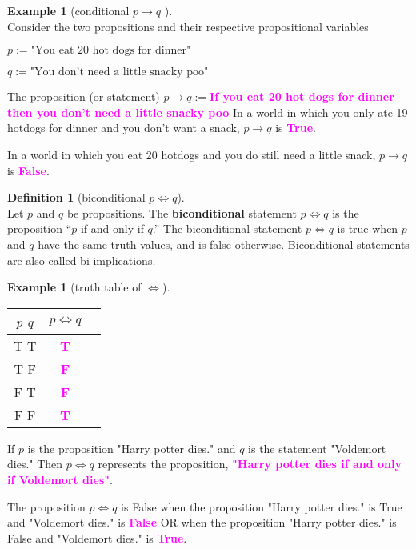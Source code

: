 \documentclass[letterpaper,10pt]{article}
\theoremstyle{plain}
\theoremstyle{definition}
\newtheorem{defn}[thm]{Definition}
\newtheorem{exmp}[thm]{Example}
\theoremstyle{remark}
\providecommand{\todo}[1]{\textcolor{magenta}{\textbf{#1}}}
\begin{document}
\newpage

\begin{exmp}[conditional $p\to q$ ] \ \\

Consider the two propositions and their respective propositional variables

$ p:=\text{"You eat 20 hot dogs for dinner"} $

$ q:=\text{"You don't need a little snacky poo"} $

The proposition (or statement)
\newline
$p\to q:= $\todo{If you eat 20 hot dogs for dinner then you don't need a little snacky poo }
\newline
In a world in which you only ate 19 hotdogs for dinner and you don't want a snack, $p\to q$ is \todo{True}.

In a world in which you eat 20 hotdogs and you do still need a little snack, $p \to q$ is \todo{False}.

\end{exmp}

\begin{defn}[biconditional $p\iff q$]\ \\
Let $p$ and $q$ be propositions. The \textbf{biconditional} statement $p \iff q$ is the proposition “$p$ if
and only if $q$.” The biconditional statement $p \iff q$ is true when $p$ and $q$ have the same truth
values, and is false otherwise. Biconditional statements are also called bi-implications.
\end{defn}

\begin{exmp}[truth table of $\iff$]
\begin{center}
\begin{tabular}{ | c | c | c |} 
  \hline
 $p$ $q$ & $ p \iff q$ \\
 \hline
  T T & \todo{T} \\ 
  T F & \todo{F} \\ 
  F T & \todo{F} \\ 
  F F & \todo{T} \\ 
  \hline
\end{tabular}
\end{center}
If $p$ is the proposition "Harry potter dies." and $q$ is the statement "Voldemort dies." Then $p \iff q$ represents the proposition, \todo{"Harry potter dies if and only if Voldemort dies"}.

The proposition $p\iff q$ is False when the proposition "Harry potter dies." is True and "Voldemort dies." is \todo{False} OR when the proposition "Harry potter dies." is False and "Voldemort dies." is \todo{True}.

\end{exmp}
\end{document}
